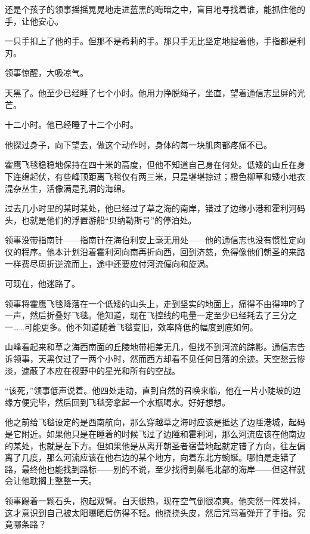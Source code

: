 \documentclass[AutoFakeBold=true]{book}
\begin{document}
还是个孩子的领事摇摇晃晃地走进蓝黑的晦暗之中，盲目地寻找着谁，能抓住他的手，让他安心。

一只手扣上了他的手。但那不是希莉的手。那只手无比坚定地捏着他，手指都是利刃。

\vspace*{1em}

领事惊醒，大吸凉气。

天黑了。他至少已经睡了七个小时。他用力挣脱绳子，坐直，望着通信志显屏的光芒。

十二小时。他已经睡了十二个小时。

他探过身子，向下望去，做这个动作时，身体的每一块肌肉都疼痛不已。

霍鹰飞毯稳稳地保持在四十米的高度，但他不知道自己身在何处。低矮的山丘在身下连绵起伏，有些峰顶距离飞毯仅有两三米，只是堪堪掠过；橙色柳草和矮小地衣混杂丛生，活像满是孔洞的海绵。

过去几小时里的某时某处，他已经过了草之海的南岸，错过了边缘小港和霍利河码头，也就是他们的浮置游船``贝纳勒斯号''的停泊处。

领事没带指南针——指南针在海伯利安上毫无用处——他的通信志也没有惯性定向仪的程序。他本计划沿着霍利河向南再折向西，回到济慈，免得像他们朝圣的来路一样费尽周折逆流而上，途中还要应付河流偏向和旋涡。

可现在，他迷路了。

领事将霍鹰飞毯降落在一个低矮的山头上，走到坚实的地面上，痛得不由得呻吟了一声，然后折叠好飞毯。他知道，现在飞控线的电量一定至少已经耗去了三分之一……可能更多。他不知道随着飞毯变旧，效率降低的幅度到底如何。

山峰看起来和草之海西南面的丘陵地带相差无几，但找不到河流的踪影。通信志告诉领事，天黑仅过了一两个小时，然而西方却看不见任何日落的余迹。天空愁云惨淡，遮蔽了本应在视野中的星光和所有的空战。

``该死，''领事低声说着。他四处走动，直到自然的召唤来临，他在一片小陡坡的边缘方便完毕，然后回到飞毯旁拿起一个水瓶喝水。{\kaishu 好好想想。}

他之前给飞毯设定的是西南航向，那么穿越草之海时应该是抵达了边陲港城，起码是它附近。如果他只是在睡着的时候飞过了边陲和霍利河，那么河流应该在他南边的某处，也就是左下方。但如果他是从离开朝圣者宿营地起就定错了方向，往左偏离了几度，那么河流应该在他右边的某个地方，向着东北方蜿蜒。哪怕是走错了路，最终他也能找到路标——别的不说，至少找得到鬃毛北部的海岸——但这样就会让他耽搁上整整一天。

领事踢着一颗石头，抱起双臂。白天很热，现在空气倒很凉爽。他突然一阵发抖，这才意识到自己被太阳曝晒后伤得不轻。他挠挠头皮，然后咒骂着弹开了手指。{\kaishu 究竟哪条路？}
\end{document}
